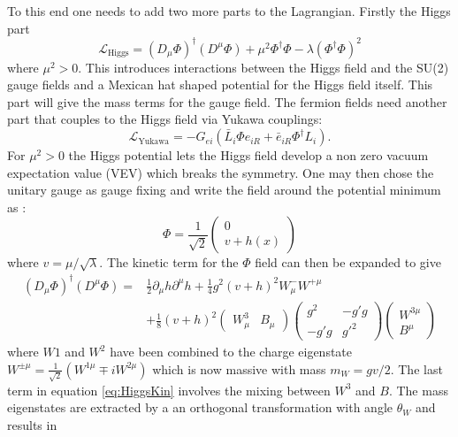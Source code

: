 To this end one needs to add two more parts to the Lagrangian. Firstly the Higgs part
\begin{equation}
\mathcal{L}_\text{Higgs}=\left(D_\mu\Phi\right)^\dagger \left(D^\mu\Phi\right)+\mu^2\Phi^\dagger\Phi-\lambda\left(\Phi^\dagger\Phi\right)^2
\end{equation}
where $\mu^2>0$. This introduces interactions between the Higgs field and the SU(2) gauge fields and a Mexican hat shaped potential for the Higgs field itself.
This part will give the mass terms for the gauge field. The fermion fields need another part that couples to the Higgs field via Yukawa couplings:
\begin{equation}
\mathcal{L}_\text{Yukawa}= -G_{ei}\left(\bar{L}_i\Phi e_{iR}+\bar{e}_{iR}\Phi^\dagger L_i\right) .
\end{equation}
For $\mu^2>0$ the Higgs potential lets the Higgs field develop a non zero vacuum expectation value (VEV) which breaks the symmetry.
One may then chose the unitary gauge as gauge fixing and write the field around the potential minimum as :
\begin{equation}
\Phi=\frac{1}{\sqrt{2}}\begin{pmatrix}
0\\v+h(x)
\end{pmatrix}
\end{equation}
where $v=\mu/\sqrt{\lambda}$.
The kinetic term for the $\Phi$ field can then be expanded to give
\begin{align}
\left(D_\mu\Phi\right)^\dagger \left(D^\mu\Phi\right)= &\frac{1}{2}\partial_\mu h\partial^\mu h+\frac{1}{4}g^2(v+h)^2W^-_\mu W^{+\mu}\\&+\frac{1}{8}(v+h)^2\begin{pmatrix}
W^3_\mu &B_\mu
\end{pmatrix}
\begin{pmatrix}
g^2&-g'g\\
-g'g&g'^2
\end{pmatrix}
\begin{pmatrix}
W^{3\mu}\\
B^\mu
\end{pmatrix}
\label{eq:HiggsKin}
\end{align}
where $W1$ and $W^2$ have been combined to the charge eigenstate $W^{\pm\mu}=\frac{1}{\sqrt{2}}(W^{1\mu} \mp i W^{2\mu})$ which is now massive with mass $m_W=gv/2$.
The last term in equation \ref{eq:HiggsKin} involves the mixing between $W^3$ and $B$. The mass eigenstates are extracted by a an orthogonal transformation with angle $\theta_W$ and results in
